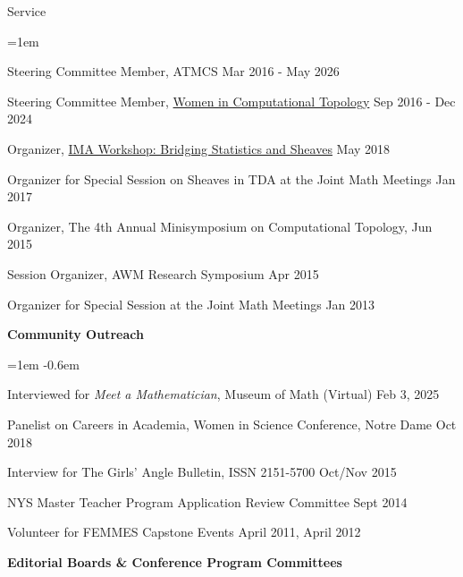 \documentclass{resume} %
\begin{document}
\begin{rSection}{Service}
\begin{list}{}{\leftmargin=1em}
\item
Steering Committee Member, ATMCS \hfill Mar 2016 - May 2026 
\item
Steering Committee Member, \href{https://awmadvance.org/research-networks/wincomptop-women-in-computational-topology/}{Women in Computational Topology} \hfill Sep 2016 - Dec 2024 
\item
Organizer, \href{https://www.ima.umn.edu/2017-2018/SW5.21-25.18}{IMA Workshop: Bridging Statistics and Sheaves} \hfill May 2018
\item
{Organizer for Special Session on Sheaves in TDA at the Joint Math Meetings} \hfill Jan 2017
\item
{Organizer, The 4th Annual Minisymposium on Computational Topology,  } \hfill Jun 2015\\
\phantom{MMM}{CG Week at the Symposium on Computational Geometry}
\item
{Session Organizer, AWM Research Symposium} \hfill Apr 2015
\item
{Organizer for Special Session at the Joint Math Meetings} \hfill Jan 2013
\end{list}


\textbf{Community Outreach}
\begin{list}{}{\leftmargin=1em}
   \itemsep -0.6em \vspace{-0.5em} %
\item Interviewed for \textit{Meet a Mathematician}, Museum of Math (Virtual) \hfill Feb 3, 2025
\item
Panelist on Careers in Academia, Women in Science Conference, Notre Dame \hfill Oct 2018
\item Interview for The Girls' Angle Bulletin,  ISSN 2151-5700 \hfill Oct/Nov 2015
\item
{NYS Master Teacher Program Application Review Committee} \hfill Sept 2014
\item
{Volunteer for FEMMES  Capstone Events} \hfill April 2011, April 2012
\end{list}

\textbf{Editorial Boards \& Conference Program Committees}


\end{rSection}
\end{document}
